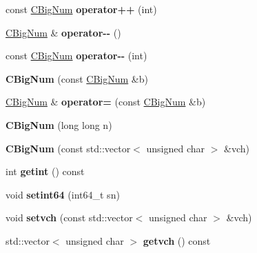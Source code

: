 \begin{DoxyCompactItemize}
\item 
\mbox{\label{class_c_big_num_aa69e12c7f330374b2d86df0da0627e58}} 
const \mbox{\hyperlink{class_c_big_num}{C\+Big\+Num}} {\bfseries operator++} (int)
\item 
\mbox{\label{class_c_big_num_a47920287946fb3a55e84af70e953e78f}} 
\mbox{\hyperlink{class_c_big_num}{C\+Big\+Num}} \& {\bfseries operator-\/-\/} ()
\item 
\mbox{\label{class_c_big_num_a13d365561d5407fc624eacb6378db4d3}} 
const \mbox{\hyperlink{class_c_big_num}{C\+Big\+Num}} {\bfseries operator-\/-\/} (int)
\item 
\mbox{\label{class_c_big_num_a50fcecb7d672c2b7d0a89e641a0682ca}} 
{\bfseries C\+Big\+Num} (const \mbox{\hyperlink{class_c_big_num}{C\+Big\+Num}} \&b)
\item 
\mbox{\label{class_c_big_num_a575e705d2120b0a43d74d798eaef48ee}} 
\mbox{\hyperlink{class_c_big_num}{C\+Big\+Num}} \& {\bfseries operator=} (const \mbox{\hyperlink{class_c_big_num}{C\+Big\+Num}} \&b)
\item 
\mbox{\label{class_c_big_num_a221b65c70969363c1b9d940a6a2de3b5}} 
{\bfseries C\+Big\+Num} (long long n)
\item 
\mbox{\label{class_c_big_num_ad3c2843e6755a612b8734eb6e0f03ced}} 
{\bfseries C\+Big\+Num} (const std\+::vector$<$ unsigned char $>$ \&vch)
\item 
\mbox{\label{class_c_big_num_afc4744c69da2e73b6e6a8941abf6d244}} 
int {\bfseries getint} () const
\item 
\mbox{\label{class_c_big_num_aca73fa36a797c91b30515ae61cc5d765}} 
void {\bfseries setint64} (int64\+\_\+t sn)
\item 
\mbox{\label{class_c_big_num_aa9236c14e34519e9b173a9a4b80f5621}} 
void {\bfseries setvch} (const std\+::vector$<$ unsigned char $>$ \&vch)
\item 
\mbox{\label{class_c_big_num_a305a57111c97172c76a6145ec840bd74}} 
std\+::vector$<$ unsigned char $>$ {\bfseries getvch} () const
\end{DoxyCompactItemize}
